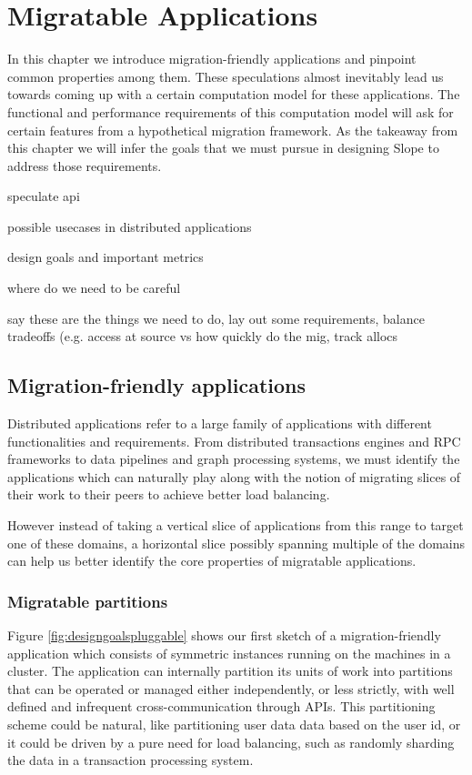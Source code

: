 \chapter{Migratable Applications}
\label{chap:migratableapps}

In this chapter we introduce migration-friendly applications and pinpoint
common properties among them. These speculations almost inevitably lead
us towards coming up with a certain computation model for these
applications.
The functional and performance requirements of this computation model will
ask for certain features from a hypothetical migration framework. As the
takeaway from this chapter we will infer the goals that we must pursue
in designing Slope to address those requirements.

speculate api

possible usecases in distributed applications

design goals and important metrics

where do we need to be careful

say these are the things we need to do, lay out some requirements,
balance tradeoffs (e.g. access at source vs how quickly do the mig,
track allocs

\section{Migration-friendly applications}
Distributed applications refer to a large family of applications with
different functionalities and requirements. From distributed transactions
engines and RPC frameworks to data pipelines and graph processing systems,
we must identify the
applications which can naturally play along with the notion of migrating
slices of their work to their peers to achieve better load balancing.

However instead of taking a vertical slice of applications from this range
to target one of these domains, a horizontal slice possibly spanning
multiple of the domains can help us better identify the core
properties of migratable applications.

\subsection{Migratable partitions}

Figure \ref{fig:designgoalspluggable} shows our first sketch of a
migration-friendly application which consists of symmetric instances
running on the machines in a cluster. The application can internally
partition its units of work into partitions that can be operated or
managed either independently, or less strictly,
with well defined and infrequent cross-communication through APIs.
This partitioning scheme could be natural, like
partitioning user data data based on the user id, or it could be driven
by a pure need for load balancing, such as randomly sharding the data
in a transaction processing system.


